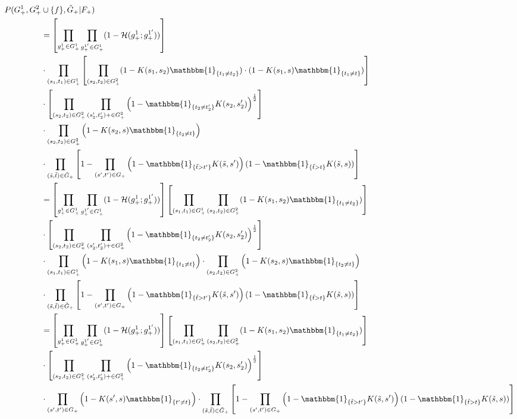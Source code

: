 \documentclass[12pt]{article}
\begin{document}
\begin{align*}
P(G_+^1, G_+^2 &\cup \{f\}, \tilde{G}_+ | F_+) \\&= \left[ \prod_{g^1_+ \in G^1_+} \prod_{g^{1'}_+ \in G^1_+} ( 1- \mH (g_+^1 ; g^{1'}_+) ) \right] \\
&\cdot \prod_{(s_1, t_1) \in G_+^1} \left[  \prod_{(s_2, t_2) \in G_+^2} (1 - K(s_1, s_2) \mathbbm{1}_{\{t_1 \neq t_2 \}}) \cdot (1 - K(s_1, s)\mathbbm{1}_{\{t_1 \neq t \}} ) \right] \\ &\cdot  \left[ \prod_{(s_2, t_2) \in G^2_+} \prod_{(s'_2, t'_2)+ \in G^2_+} \left( 1- \mathbbm{1}_{\{ t_2 \neq t'_2 \}} K(s_2, s'_2) \right)^{\frac{1}{2}} \right] \\
&\cdot \prod_{(s_2, t_2) \in G_+^2} \left( 1 - K(s_2, s) \mathbbm{1}_{\{t_2 \neq t\}} \right) \\
&\cdot \prod_{(\tilde{s}, \tilde{t}) \in \tilde{G}_+} \left[ 1 - \prod_{(s', t') \in G_+}  \left(1 - \mathbbm{1}_{\{ \tilde{t} > t' \} } K(\tilde{s}, s')\right) (1 - \mathbbm{1}_{\{ \tilde{t} > t\}}K(\tilde{s}, s)) \right] \\
& = \left[ \prod_{g^1_+ \in G^1_+} \prod_{g^{1'}_+ \in G^1_+} ( 1- \mH (g_+^1 ; g^{1'}_+) ) \right]
\left[ \prod_{(s_1, t_1) \in G_+^1}  \prod_{(s_2, t_2) \in G_+^2} (1 - K(s_1, s_2) \mathbbm{1}_{\{t_1 \neq t_2 \}})\right] \\
&\cdot \left[ \prod_{(s_2, t_2) \in G^2_+} \prod_{(s'_2, t'_2)+ \in G^2_+} \left( 1- \mathbbm{1}_{\{ t_2 \neq t'_2 \}} K(s_2, s'_2) \right)^{\frac{1}{2}} \right] \\
&\cdot  \prod_{(s_1, t_1) \in G_+^1} \left(1 - K(s_1, s)\mathbbm{1}_{\{t_1 \neq t \}} \right) \cdot \prod_{(s_2, t_2) \in G_+^2} \left( 1 - K(s_2, s) \mathbbm{1}_{\{t_2 \neq t\}} \right)  \\
&\cdot \prod_{(\tilde{s}, \tilde{t}) \in \tilde{G}_+} \left[ 1 - \prod_{(s', t') \in G_+}  \left(1 - \mathbbm{1}_{\{ \tilde{t} > t' \} } K(\tilde{s}, s')\right) (1 - \mathbbm{1}_{\{ \tilde{t} > t\}}K(\tilde{s}, s)) \right] \\
& = \left[ \prod_{g^1_+ \in G^1_+} \prod_{g^{1'}_+ \in G^1_+} ( 1- \mH (g_+^1 ; g^{1'}_+) ) \right]
\left[ \prod_{(s_1, t_1) \in G_+^1}  \prod_{(s_2, t_2) \in G_+^2} (1 - K(s_1, s_2) \mathbbm{1}_{\{t_1 \neq t_2 \}})\right] \\
&\cdot \left[ \prod_{(s_2, t_2) \in G^2_+} \prod_{(s'_2, t'_2)+ \in G^2_+} \left( 1- \mathbbm{1}_{\{ t_2 \neq t'_2 \}} K(s_2, s'_2) \right)^{\frac{1}{2}} \right] \\
&\cdot  \prod_{(s', t') \in G_+} \left(1 - K(s', s)\mathbbm{1}_{\{t' \neq t \}} \right) \cdot \prod_{(\tilde{s}, \tilde{t}) \in \tilde{G}_+} \left[ 1 - \prod_{(s', t') \in G_+}  \left(1 - \mathbbm{1}_{\{ \tilde{t} > t' \} } K(\tilde{s}, s')\right) (1 - \mathbbm{1}_{\{ \tilde{t} > t\}}K(\tilde{s}, s)) \right]
\end{align*}
\end{document}
